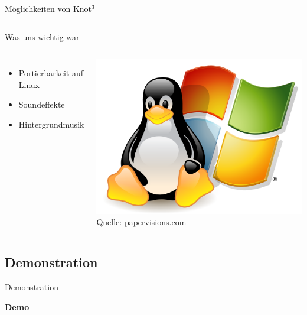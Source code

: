 \documentclass[18pt]{beamer}
\begin{document}
\begin{frame}{Möglichkeiten von Knot$^3$}
\begin{columns}[c]
\end{columns}
\end{frame}
\begin{frame}{Was uns wichtig war}

\begin{columns}[c] 
    \begin{itemize}
	\item Portierbarkeit auf Linux
	\item Soundeffekte
	\item Hintergrundmusik
	\end{itemize}
    \includegraphics[width=\textwidth]{linux} \\
    Quelle: papervisions.com
    \end{columns}
\end{frame}



\subsection{Demonstration}
\begin{frame}{Demonstration}
\begin{center}
\Huge \textbf{Demo}
\end{center}

\end{frame}

\end{document}
